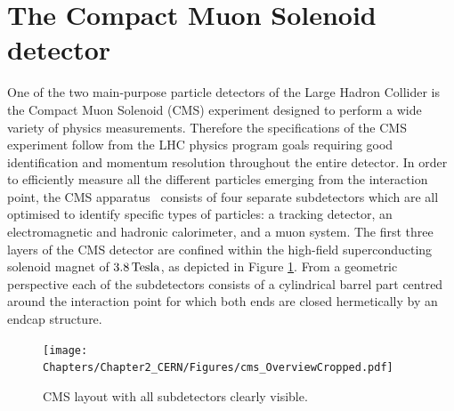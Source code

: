 \section{The Compact Muon Solenoid detector}\label{sec::CMS}

One of the two main-purpose particle detectors of the Large Hadron Collider is the Compact Muon Solenoid (CMS) experiment designed to perform a wide variety of physics measurements. Therefore the specifications of the CMS experiment follow from the LHC physics program goals requiring good identification and momentum resolution throughout the entire detector.
In order to efficiently measure all the different particles emerging from the interaction point, the CMS apparatus~\cite{CMSTDR} consists of four separate subdetectors which are all optimised to identify specific types of particles: a tracking detector, an electromagnetic and hadronic calorimeter, and a muon system. 
The first three layers of the CMS detector are confined within the high-field superconducting solenoid magnet of $3.8 \, \mathrm{Tesla}$, as depicted in Figure \ref{fig::CMSFig}. 
From a geometric perspective each of the subdetectors consists of a cylindrical barrel part centred around the interaction point for which both ends are closed hermetically by an endcap structure.
\begin{figure}[h!t]
 \centering
 \texttt{[image: Chapters/Chapter2\_CERN/Figures/cms\_OverviewCropped.pdf]}%
 \caption{CMS layout with all subdetectors clearly visible.} \label{fig::CMSFig}
\end{figure}


